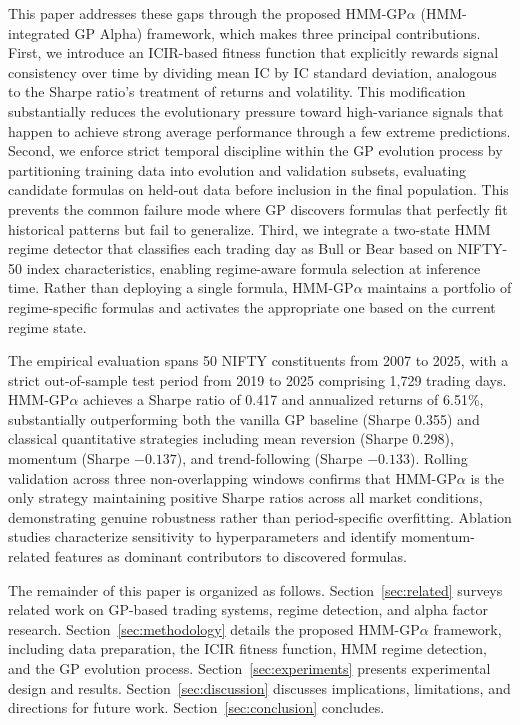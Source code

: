 \documentclass{ieeeaccess}
\begin{document}
This paper addresses these gaps through the proposed HMM-GP$\alpha$ (HMM-integrated GP Alpha) framework, which makes three principal contributions. First, we introduce an ICIR-based fitness function that explicitly rewards signal consistency over time by dividing mean IC by IC standard deviation, analogous to the Sharpe ratio's treatment of returns and volatility. This modification substantially reduces the evolutionary pressure toward high-variance signals that happen to achieve strong average performance through a few extreme predictions. Second, we enforce strict temporal discipline within the GP evolution process by partitioning training data into evolution and validation subsets, evaluating candidate formulas on held-out data before inclusion in the final population. This prevents the common failure mode where GP discovers formulas that perfectly fit historical patterns but fail to generalize. Third, we integrate a two-state HMM regime detector that classifies each trading day as Bull or Bear based on NIFTY-50 index characteristics, enabling regime-aware formula selection at inference time. Rather than deploying a single formula, HMM-GP$\alpha$ maintains a portfolio of regime-specific formulas and activates the appropriate one based on the current regime state.

The empirical evaluation spans 50 NIFTY constituents from 2007 to 2025, with a strict out-of-sample test period from 2019 to 2025 comprising 1,729 trading days. HMM-GP$\alpha$ achieves a Sharpe ratio of 0.417 and annualized returns of 6.51\%, substantially outperforming both the vanilla GP baseline (Sharpe 0.355) and classical quantitative strategies including mean reversion (Sharpe 0.298), momentum (Sharpe $-0.137$), and trend-following (Sharpe $-0.133$). Rolling validation across three non-overlapping windows confirms that HMM-GP$\alpha$ is the only strategy maintaining positive Sharpe ratios across all market conditions, demonstrating genuine robustness rather than period-specific overfitting. Ablation studies characterize sensitivity to hyperparameters and identify momentum-related features as dominant contributors to discovered formulas.

The remainder of this paper is organized as follows. Section~\ref{sec:related} surveys related work on GP-based trading systems, regime detection, and alpha factor research. Section~\ref{sec:methodology} details the proposed HMM-GP$\alpha$ framework, including data preparation, the ICIR fitness function, HMM regime detection, and the GP evolution process. Section~\ref{sec:experiments} presents experimental design and results. Section~\ref{sec:discussion} discusses implications, limitations, and directions for future work. Section~\ref{sec:conclusion} concludes.
\end{document}

